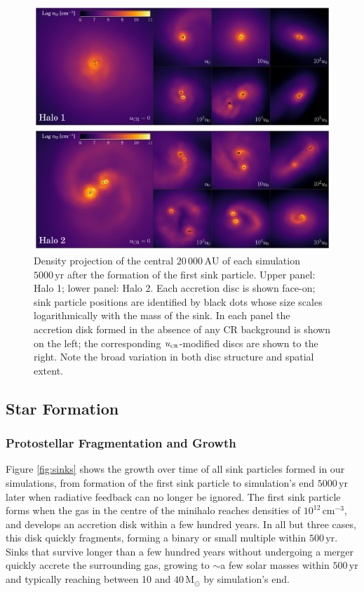 \documentclass{thesis}
\newcommand{\cc}{\ensuremath{\,\mathrm{cm}^{-3}}\xspace}
\newcommand{\msun}{\ensuremath{\,\mathrm{M}_{\odot}}\xspace}
\newcommand{\au}{\ensuremath{\,\mathrm{AU}}\xspace}
\newcommand{\yr}{\ensuremath{\,\mathrm{yr}}\xspace}
\newcommand{\ucr}{\ensuremath{{u}_{\textsc{cr}}}\xspace}
\begin{document}
\begin{figure}
\begin{center}
\includegraphics[width=\columnwidth]{figures/disks/disks}
\caption{\label{fig:disks} 
Density projection of the central $20\,000\au$ of each simulation $5000\yr$ after the formation of the first sink particle.
Upper panel: Halo 1; lower panel: Halo 2.
Each accretion disc is shown face-on; sink particle positions are identified by black dots whose size scales logarithmically with the mass of the sink.
In each panel the accretion disk formed in the absence of any CR background is shown on the left; the corresponding $\ucr$-modified discs are shown to the right.
Note the broad variation in both disc structure and spatial extent.%
}
\end{center}
\end{figure}

\subsection{Star Formation}
\subsubsection{Protostellar Fragmentation and Growth}
\label{sec:sink_formation}

Figure \ref{fig:sinks} shows the growth over time of all sink particles formed in our simulations, from formation of the first sink particle to simulation's end $5000\yr$ later when radiative feedback can no longer be ignored. 
The first sink particle forms when the gas in the centre of the minihalo reaches densities of $10^{12}\cc$, and develops an accretion disk within a few hundred years. 
In all but three cases, this disk quickly fragments, forming a binary or small multiple within $500\yr$. 
Sinks that survive longer than a few hundred years without undergoing a merger quickly accrete the surrounding gas, growing to $\sim$a few solar masses within $500\yr$ and typically reaching between 10 and $40\msun$ by simulation's end.
\end{document}
